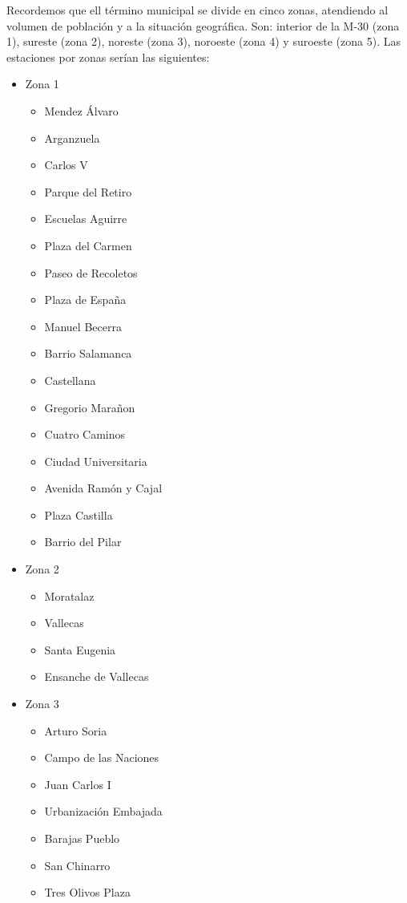 Recordemos que ell término municipal se divide en cinco zonas, atendiendo al volumen de población y a la situación geográfica. Son: interior de la M-30 (zona 1), sureste (zona 2), noreste (zona 3), noroeste (zona 4) y suroeste (zona 5). Las estaciones por zonas serían las siguientes:

\begin{itemize}
	\item Zona 1
	\begin{itemize}
		\item Mendez Álvaro
		\item Arganzuela
		\item Carlos V
		\item Parque del Retiro
		\item Escuelas Aguirre
		\item Plaza del Carmen
		\item Paseo de Recoletos
		\item Plaza de España
		\item Manuel Becerra
		\item Barrio Salamanca
		\item Castellana
		\item Gregorio Marañon
		\item Cuatro Caminos
		\item Ciudad Universitaria
		\item Avenida Ramón y Cajal
		\item Plaza Castilla
		\item Barrio del Pilar
	\end{itemize}
	\item Zona 2
	\begin{itemize}
		\item Moratalaz
		\item Vallecas
		\item Santa Eugenia
		\item Ensanche de Vallecas
	\end{itemize}
	\item Zona 3
	\begin{itemize}
		\item Arturo Soria
		\item Campo de las Naciones
		\item Juan Carlos I
		\item Urbanización Embajada
		\item Barajas Pueblo
		\item San Chinarro
		\item Tres Olivos Plaza

\end{itemize}
\end{itemize}
